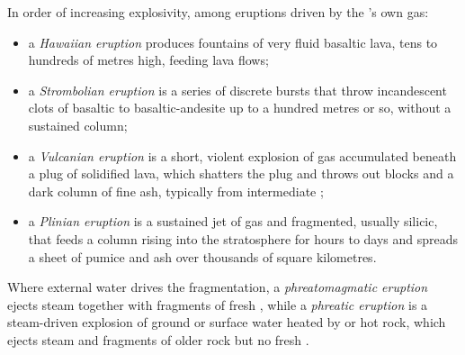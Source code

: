 \begin{definition}\label{def:b2:eruptive-styles:styles}
In order of increasing explosivity, among eruptions driven by the 's own gas:
\begin{itemize}
\item a \emph{Hawaiian eruption} produces fountains of
very fluid basaltic lava, tens to hundreds of metres high, feeding lava flows;
\item a \emph{Strombolian eruption} is a series of
discrete bursts that throw incandescent clots of basaltic to
basaltic-andesite  up to a hundred metres or so, without a sustained
column;
\item a \emph{Vulcanian eruption} is a short, violent
explosion of gas accumulated beneath a plug of solidified lava, which shatters
the plug and throws out blocks and a dark column of fine ash, typically from
intermediate ;
\item a \emph{Plinian eruption} is a sustained jet of gas
and fragmented, usually silicic,  that feeds a column rising into the
stratosphere for hours to days and spreads a sheet of pumice and ash over
thousands of square kilometres.
\end{itemize}
Where external water drives the fragmentation, a \emph{phreatomagmatic
eruption} ejects steam together with fragments
of fresh , while a \emph{phreatic eruption} is a
steam-driven explosion of ground or surface water heated by  or hot rock,
which ejects steam and fragments of older rock but no fresh .
\end{definition}

